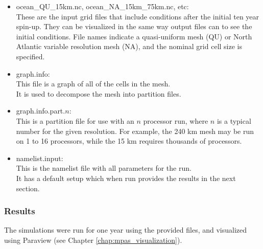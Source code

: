 \begin{itemize}
	\item ocean\_QU\_15km.nc, ocean\_NA\_15km\_75km.nc, etc: \\
		These are the input grid files that include conditions after the initial ten year spin-up. They can be visualized in the same way output files can to see the initial conditions. File names indicate a quasi-uniform mesh (QU) or North Atlantic variable resolution mesh (NA), and the nominal grid cell size is specified.
	\item graph.info: \\
		This file is a graph of all of the cells in the mesh. \\
		It is used to decompose the mesh into partition files.
	\item graph.info.part.$n$: \\
		This is a partition file for use with an $n$ processor run, where $n$ is a typical number for the given resolution.  For example, the 240 km mesh may be run on 1 to 16 processors, while the 15 km requires thousands of processors.
	\item namelist.input: \\
		This is the namelist file with all parameters for the run. \\
		It has a default setup which when run provides the results in the next section.
\end{itemize}

\subsubsection{Results}
\label{subsubsec:realWorld_results}

The simulations were run for one year using the provided files, and visualized using Paraview (see Chapter \ref{chap:mpas_visualization}).

